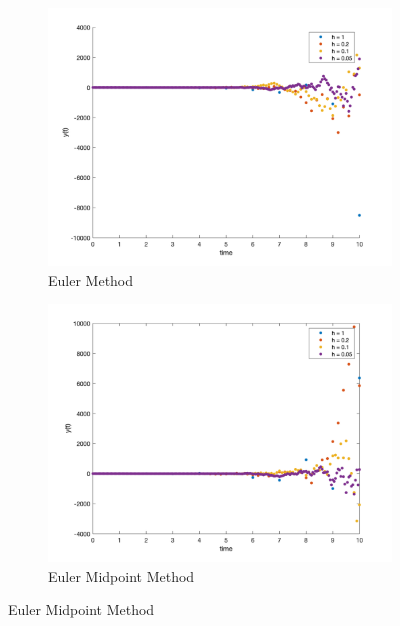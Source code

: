 \documentclass[12pt]{article}
\begin{document}
\newpage

\begin{figure}[htp]
\centering

\begin{subfigure}{0.49\columnwidth}
\centering
\includegraphics[width=\textwidth]{euler_t_10.png}
\caption{Euler Method}
\label{fig:time1}
\end{subfigure}\hfill
\begin{subfigure}{0.49\columnwidth}
\centering
\includegraphics[width=\textwidth]{euler_mid_t_10.png}
\caption{Euler Midpoint Method}
\label{fig:time2}
\end{subfigure}

\medskip


\end{figure}
\end{document}
